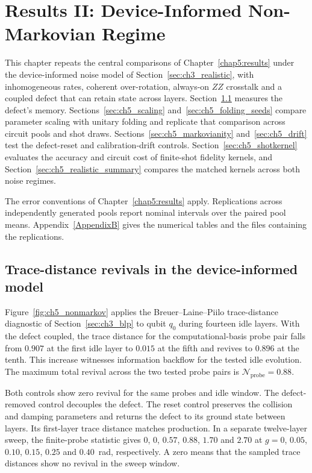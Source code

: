 \documentclass[Thesis.tex]{subfiles}
\begin{document}
\setcounter{chapter}{5} %




\chapter{Results II: Device-Informed Non-Markovian Regime}\label{chap6:realistic}

This chapter repeats the central comparisons of Chapter~\ref{chap5:results}
under the device-informed noise model of Section~\ref{sec:ch3_realistic}, with
inhomogeneous rates, coherent over-rotation, always-on $ZZ$ crosstalk and a
coupled defect that can retain state across layers.
Section~\ref{sec:ch5_nonmarkov} measures the defect's memory.
Sections~\ref{sec:ch5_scaling} and~\ref{sec:ch5_folding_seeds} compare
parameter scaling with unitary folding and replicate that comparison across
circuit pools and shot draws. Sections~\ref{sec:ch5_markovianity}
and~\ref{sec:ch5_drift} test the defect-reset and calibration-drift controls.
Section~\ref{sec:ch5_shotkernel} evaluates the accuracy and circuit cost of
finite-shot fidelity kernels, and Section~\ref{sec:ch5_realistic_summary}
compares the matched kernels across both noise regimes.

The error conventions of Chapter~\ref{chap5:results} apply. Replications across
independently generated pools report nominal intervals over the paired pool
means. Appendix~\ref{AppendixB} gives the numerical tables and the files
containing the replications.

\section{Trace-distance revivals in the device-informed model}
\label{sec:ch5_nonmarkov}

Figure~\ref{fig:ch5_nonmarkov} applies the Breuer--Laine--Piilo trace-distance
diagnostic of Section~\ref{sec:ch3_blp} to qubit $q_0$ during fourteen idle
layers. With the defect coupled, the trace distance for the computational-basis
probe pair falls from $0.907$ at the first idle layer to $0.015$ at the fifth
and revives to $0.896$ at the tenth. This increase witnesses information
backflow for the tested idle evolution. The maximum total revival across the
two tested probe pairs is $\mathcal{N}_{\mathrm{probe}}=0.88$.

Both controls show zero revival for the same probes and idle window. The
defect-removed control decouples the defect. The reset control preserves the
collision and damping parameters and returns the defect to its ground state
between layers. Its first-layer trace distance matches production. In a separate
twelve-layer sweep, the finite-probe statistic gives $0$, $0$, $0.57$, $0.88$,
$1.70$ and $2.70$ at $g=0$, $0.05$, $0.10$, $0.15$, $0.25$ and $0.40$~rad,
respectively. A zero means that the sampled trace distances show no revival
in the sweep window.
\end{document}
